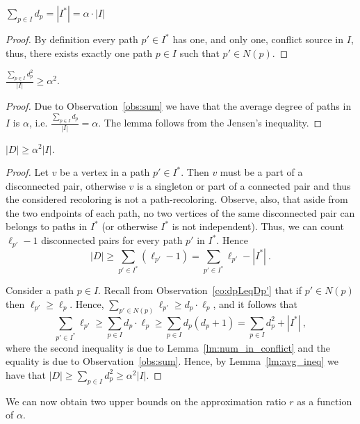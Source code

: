 \begin{observation}
\label{obs:sum}
$\sum_{p \in I}{d_p} = |I^*| = \alpha \cdot |I|$
\end{observation}
\begin{proof}
By definition every path $p' \in I^*$ has one, and only one, conflict
source in $I$, thus, 
there exists exactly one path $p \in I$ such that $p' \in N(p)$.
{}\end{proof}


\begin{lemma}
\label{lm:avg_ineq}
$\frac{\sum_{p \in I}{d_p^2}}{|I|} \geq \alpha^2$.
\end{lemma}
\begin{proof}
Due to Observation~\ref{obs:sum} we have that the average degree of
paths in $I$ is $\alpha$, i.e. $\frac{\sum_{p \in I}{d_p}}{|I|}
= \alpha$.  The lemma follows from the Jensen's inequality.
{}\end{proof}


\begin{lemma}
\label{lemma:alpha-squared}
$|D| \geq \alpha^2|I|$.
\end{lemma}
\begin{proof}
Let $v$ be a vertex in a path $p' \in I^*$.
Then $v$ must be a part of
a disconnected pair, otherwise $v$ is a singleton or part of a
connected pair and thus the considered recoloring is not a
path-recoloring.  Observe, also, that aside from the two endpoints of
each path, no two vertices of the same disconnected pair can belongs to paths
in $I^*$ (or otherwise $I^*$ is not independent).  
Thus, we can count $\ell_{p'} - 1$ disconnected pairs for every path $p'$ in
$I^*$.  
Hence
\[
|D| \geq \sum_{p' \in I^*} (\ell_{p'} - 1) = \sum_{p' \in I^*}{\ell_{p'}} -
|I^*| ~.
\]

Consider a path $p \in I$. 
Recall from Observation~\ref{co:dpLeqDp'} that if $p' \in N(p)$ 
then $\ell_{p'} \geq \ell_p$.
%
Hence, 
$\sum_{p' \in N(p)}{\ell_{p'}} \geq d_p \cdot \ell_p$, 
and it follows that
\[
\sum_{p' \in I^*} \ell_{p'}
\geq \sum_{p \in I} d_p \cdot \ell_p
\geq \sum_{p \in I} d_p(d_p+1)
=    \sum_{p \in I} d_p^2 + |I^*|
~,
\]
where the second inequality is due to Lemma~\ref{lm:num_in_conflict}
and the equality is due to Observation~\ref{obs:sum}.
Hence, by Lemma~\ref{lm:avg_ineq} we have that
\(
|D| \geq \sum_{p \in I} d_p^2 \geq \alpha^2 |I|
\).
{}\end{proof}

We can now obtain two upper bounds on the approximation ratio $r$ as a
function of $\alpha$. 

